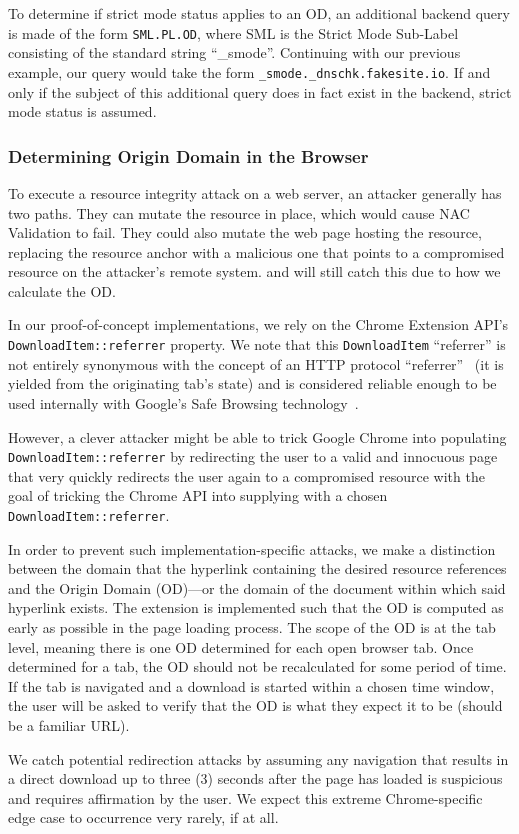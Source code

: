 To determine if strict mode status applies to an OD, an additional backend query
is made of the form \texttt{SML.PL.OD}, where SML is the Strict Mode Sub-Label
consisting of the standard string ``\_smode''. Continuing with our previous
example, our query would take the form \texttt{\_smode.\_dnschk.fakesite.io}. If
and only if the subject of this additional query does in fact exist in the
backend, strict mode status is assumed.

\subsubsection{Determining Origin Domain in the Browser}

To execute a resource integrity attack on a web server, an attacker generally
has two paths. They can mutate the resource in place, which would cause NAC
Validation to fail. They could also mutate the web page hosting the resource,
replacing the resource anchor with a malicious one that points to a compromised
resource on the attacker's remote system. \DNSSYS{} and \DHTSYS{} will still
catch this due to how we calculate the OD.

In our proof-of-concept implementations, we rely on the Chrome Extension API's
\texttt{DownloadItem::referrer} property. We note that this
\texttt{DownloadItem} ``referrer'' is not entirely synonymous with the concept
of an HTTP protocol ``referrer''~\cite{ChromiumReferrerSource} (\ie it is
yielded from the originating tab's state) and is considered reliable enough to
be used internally with Google's Safe Browsing
technology~\cite{ChromiumReferrer}.

However, a clever attacker might be able to trick Google Chrome into populating
\texttt{DownloadItem::referrer} by redirecting the user to a valid and innocuous
page that very quickly redirects the user again to a compromised resource with
the goal of tricking the Chrome API into supplying \SYSTEM{} with a chosen
\texttt{DownloadItem::referrer}.

In order to prevent such implementation-specific attacks, we make a distinction
between the domain that the hyperlink containing the desired resource references
and the Origin Domain (OD)---or the domain of the document within which said
hyperlink exists. The extension is implemented such that the OD is computed as
early as possible in the page loading process. The scope of the OD is at the tab
level, meaning there is one OD determined for each open browser tab. Once
determined for a tab, the OD should not be recalculated for some period of time.
If the tab is navigated and a download is started within a chosen time window,
the user will be asked to verify that the OD is what they expect it to be
(should be a familiar URL).

We catch potential redirection attacks by assuming any navigation that results
in a direct download up to three (3) seconds after the page has loaded is
suspicious and requires affirmation by the user. We expect this extreme
Chrome-specific edge case to occurrence very rarely, if at all.
